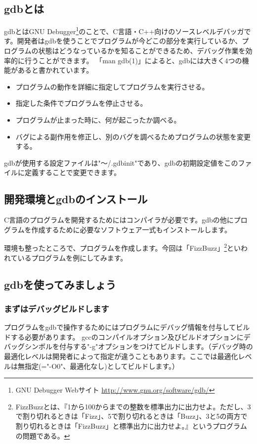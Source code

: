 \documentclass[mingoth,a4paper]{jsarticle}
\begin{document}
\subsection{gdbとは}
gdbとはGNU Debugger\footnote{GNU Debugger Webサイト
\url{http://www.gnu.org/software/gdb/}}のことで、C言語・C++向けのソースレベルデバッガです。開発者はgdbを使うことでプログラムが今どこの部分を実行しているか、プログラムの状態はどうなっているかを知ることができるため、デバッグ作業を効率的に行うことができます。
「man gdb(1)」によると、gdbには大きく4つの機能があると書かれています。
\begin{itemize}
 \item プログラムの動作を詳細に指定してプログラムを実行させる。
 \item 指定した条件でプログラムを停止させる。
 \item プログラムが止まった時に、何が起こったか調べる。
 \item バグによる副作用を修正し、別のバグを調べるためプログラムの状態を変更する。
\end{itemize}

gdbが使用する設定ファイルは"〜/.gdbinit"であり、gdbの初期設定値をこのファイルに定義することで変更できます。

\subsection{開発環境とgdbのインストール}
C言語のプログラムを開発するためにはコンパイラが必要です。gdbの他にプログラムを作成するために必要なソフトウェア一式もインストールします。

環境も整ったところで、プログラムを作成します。今回は「FizzBuzz」\footnote{FizzBuzzとは、『1から100からまでの整数を標準出力に出力せよ。ただし、3で割り切れるときは「Fizz」、5で割り切れるときは「Buzz」、3と5の両方で割り切れるときは「FizzBuzz」と標準出力に出力せよ。』というプログラムの問題である。}といわれているプログラムを例にしてみます。

\subsection{gdbを使ってみましょう}
\subsubsection{まずはデバッグビルドします}
プログラムをgdbで操作するためにはプログラムにデバッグ情報を付与してビルドする必要があります。
gccのコンパイルオプション及びビルドオプションにデバッグシンボルを付与する"-g"オプションをつけてビルドします。（デバッグ時の最適化レベルは開発者によって指定が違うこともあります。ここでは最適化レベルは無指定(="-O0"、最適化なし)としてビルドします。）
\end{document}
